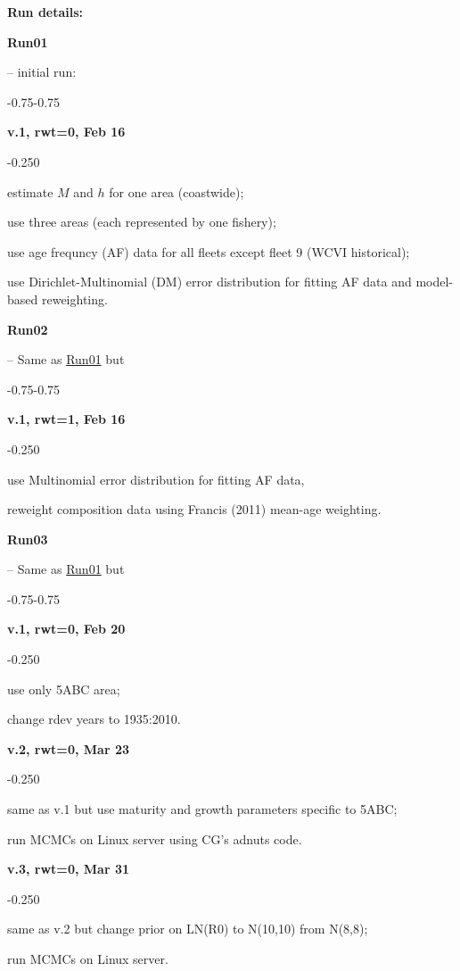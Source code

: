 \textbf{Run details:}

\hypertarget{R01}{\textbf{Run01}} -- initial run:
\begin{itemize_csas}{-0.75}{-0.75}
	\item \textbf{v.1, rwt=0, Feb 16}
	\begin{itemize_csas}{-0.25}{0}
		\item estimate $M$ and $h$ for one area (coastwide);
		\item use three areas (each represented by one fishery);
		\item use age frequncy (AF) data for all fleets except fleet 9 (WCVI historical);
		\item use Dirichlet-Multinomial (DM) error distribution for fitting AF data and model-based reweighting.
	\end{itemize_csas}
\end{itemize_csas}

\hypertarget{R02}{\textbf{Run02}} -- Same as \hyperlink{R01}{Run01} but
\begin{itemize_csas}{-0.75}{-0.75}
	\item \textbf{v.1, rwt=1, Feb 16}
	\begin{itemize_csas}{-0.25}{0}
		\item use Multinomial error distribution for fitting AF data,
		\item reweight composition data using Francis (2011) mean-age weighting.
	\end{itemize_csas}
\end{itemize_csas}

\hypertarget{R03}{\textbf{Run03}} -- Same as \hyperlink{R01}{Run01} but
\begin{itemize_csas}{-0.75}{-0.75}
	\item \textbf{v.1, rwt=0, Feb 20}
	\begin{itemize_csas}{-0.25}{0}
		\item use only 5ABC area;
		\item change rdev years to 1935:2010.
	\end{itemize_csas}
	\item \textbf{v.2, rwt=0, Mar 23}
	\begin{itemize_csas}{-0.25}{0}
		\item same as v.1 but use maturity and growth parameters specific to 5ABC;
		\item run MCMCs on Linux server using CG's adnuts code.
	\end{itemize_csas}
	\item \textbf{v.3, rwt=0, Mar 31}
	\begin{itemize_csas}{-0.25}{0}
		\item same as v.2 but change prior on LN(R0) to N(10,10) from N(8,8);
		\item run MCMCs on Linux server.
	\end{itemize_csas}
\end{itemize_csas}

